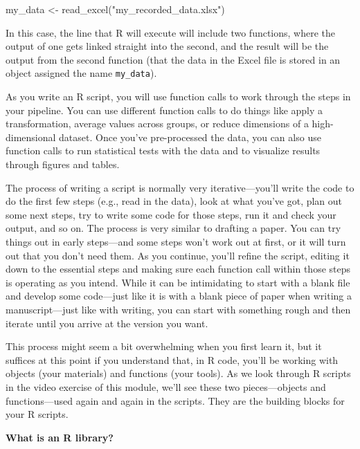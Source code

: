 \documentclass[]{tufte-book}
\newenvironment{Shaded}{}{}
\newcommand{\FunctionTok}[1]{\textcolor[rgb]{0.02,0.16,0.49}{#1}}
\newcommand{\NormalTok}[1]{#1}
\newcommand{\OtherTok}[1]{\textcolor[rgb]{0.00,0.44,0.13}{#1}}
\newcommand{\StringTok}[1]{\textcolor[rgb]{0.25,0.44,0.63}{#1}}
\begin{document}
\begin{Shaded}
\begin{Highlighting}[]
\NormalTok{my\_data }\OtherTok{\textless{}{-}} \FunctionTok{read\_excel}\NormalTok{(}\StringTok{"my\_recorded\_data.xlsx"}\NormalTok{)}
\end{Highlighting}
\end{Shaded}

In this case, the line that R will execute will include two functions, where the
output of one gets linked straight into the second, and the result will be the
output from the second function (that the data in the Excel file is stored in
an object assigned the name \texttt{my\_data}).

As you write an R script, you will use function calls to work through the
steps in your pipeline. You can use different function calls to do things like
apply a transformation, average values across groups, or reduce dimensions of
a high-dimensional dataset. Once you've pre-processed the data, you can also use
function calls to run statistical tests with the data and to visualize results
through figures and tables.

The process of writing a script is normally very iterative---you'll write the
code to do the first few steps (e.g., read in the data), look at what you've
got, plan out some next steps, try to write some code for those steps, run it
and check your output, and so on. The process is very similar to drafting a
paper. You can try things out in early steps---and some steps won't work out at
first, or it will turn out that you don't need them. As you continue, you'll
refine the script, editing it down to the essential steps and making sure each
function call within those steps is operating as you intend. While it can be
intimidating to start with a blank file and develop some code---just like it is
with a blank piece of paper when writing a manuscript---just like with writing,
you can start with something rough and then iterate until you arrive at
the version you want.

This process might seem a bit overwhelming when you first learn it, but it
suffices at this point if you understand that, in R code, you'll be working with
objects (your materials) and functions (your tools). As we look through R
scripts in the video exercise of this module, we'll see these two pieces---objects and
functions---used again and again in the scripts. They are the building blocks
for your R scripts.

\textbf{What is an R library?}
\end{document}
